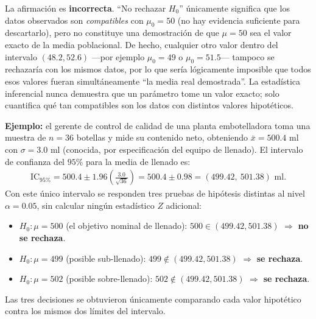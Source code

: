 \begin{solproblema}[prob:4f1ea6b]
	La afirmación es \textbf{incorrecta}. ``No rechazar $H_0$'' únicamente significa que los datos observados son \emph{compatibles} con $\mu_0 = 50$ (no hay evidencia suficiente para descartarlo), pero no constituye una demostración de que $\mu = 50$ sea el valor exacto de la media poblacional. De hecho, cualquier otro valor dentro del intervalo $(48.2, 52.6)$ —por ejemplo $\mu_0 = 49$ o $\mu_0 = 51.5$— tampoco se rechazaría con los mismos datos, por lo que sería lógicamente imposible que todos esos valores fueran simultáneamente ``la media real demostrada''. La estadística inferencial nunca demuestra que un parámetro tome un valor exacto; solo cuantifica qué tan compatibles son los datos con distintos valores hipotéticos.
\end{solproblema}

\begin{solproblema}[prob:1e58b99]
	\textbf{Ejemplo:} el gerente de control de calidad de una planta embotelladora toma una muestra de $n = 36$ botellas y mide su contenido neto, obteniendo $\bar{x} = 500.4$ ml con $\sigma = 3.0$ ml (conocida, por especificación del equipo de llenado). El intervalo de confianza del $95\%$ para la media de llenado es:
	\begin{align}
		\text{IC}_{95\%} = 500.4 \pm 1.96 \left(\frac{3.0}{\sqrt{36}}\right) = 500.4 \pm 0.98 = (499.42,\ 501.38) \text{ ml}.
	\end{align}
	Con este único intervalo se responden tres pruebas de hipótesis distintas al nivel $\alpha = 0.05$, sin calcular ningún estadístico $Z$ adicional:
	\begin{itemize}
		\item $H_0: \mu = 500$ (el objetivo nominal de llenado): $500 \in (499.42, 501.38)$ $\Rightarrow$ \textbf{no se rechaza}.
		\item $H_0: \mu = 499$ (posible sub-llenado): $499 \notin (499.42, 501.38)$ $\Rightarrow$ \textbf{se rechaza}.
		\item $H_0: \mu = 502$ (posible sobre-llenado): $502 \notin (499.42, 501.38)$ $\Rightarrow$ \textbf{se rechaza}.
	\end{itemize}
	Las tres decisiones se obtuvieron únicamente comparando cada valor hipotético contra los mismos dos límites del intervalo.
\end{solproblema}
